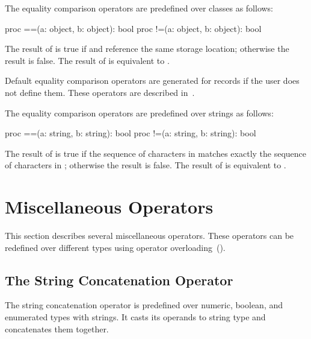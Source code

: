 The equality comparison operators are predefined over classes as
follows:
\begin{chapel}
proc ==(a: object, b: object): bool
proc !=(a: object, b: object): bool
\end{chapel}
The result of  is true if  and  reference
the same storage location; otherwise the result is false.  The result
of  is equivalent to .

Default equality comparison operators are generated for records if the
user does not define them.  These operators are described
in~.

The equality comparison operators are predefined over strings as
follows:
\begin{chapel}
proc ==(a: string, b: string): bool
proc !=(a: string, b: string): bool
\end{chapel}
The result of  is true if the sequence of characters
in  matches exactly the sequence of characters in ;
otherwise the result is false.  The result of  is
equivalent to .

\section{Miscellaneous Operators}
\label{Miscellaneous_Operators}

This section describes several miscellaneous operators.  These
operators can be redefined over different types using operator
overloading~().

\subsection{The String Concatenation Operator}
\label{The_String_Concatenation_Operator}

The string concatenation operator \chpl{+} is predefined over numeric, boolean,
and enumerated types with strings. It casts its operands to string type and
concatenates them together.

